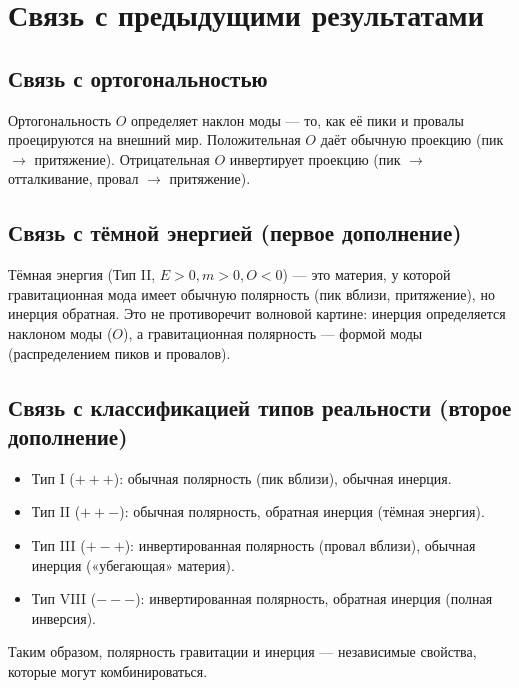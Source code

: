 \documentclass[12pt,a4paper]{article}
\begin{document}
\section{Связь с предыдущими результатами}

\subsection{Связь с ортогональностью}
Ортогональность $O$ определяет наклон моды --- то, как её пики и провалы проецируются на внешний мир. Положительная $O$ даёт обычную проекцию (пик $\to$ притяжение). Отрицательная $O$ инвертирует проекцию (пик $\to$ отталкивание, провал $\to$ притяжение).

\subsection{Связь с тёмной энергией (первое дополнение)}
Тёмная энергия (Тип II, $E > 0, m > 0, O < 0$) --- это материя, у которой гравитационная мода имеет обычную полярность (пик вблизи, притяжение), но инерция обратная. Это не противоречит волновой картине: инерция определяется наклоном моды ($O$), а гравитационная полярность --- формой моды (распределением пиков и провалов).

\subsection{Связь с классификацией типов реальности (второе дополнение)}
\begin{itemize}
    \item Тип I ($+ + +$): обычная полярность (пик вблизи), обычная инерция.
    \item Тип II ($+ + -$): обычная полярность, обратная инерция (тёмная энергия).
    \item Тип III ($+ - +$): инвертированная полярность (провал вблизи), обычная инерция («убегающая» материя).
    \item Тип VIII ($- - -$): инвертированная полярность, обратная инерция (полная инверсия).
\end{itemize}

Таким образом, полярность гравитации и инерция --- независимые свойства, которые могут комбинироваться.
\end{document}
